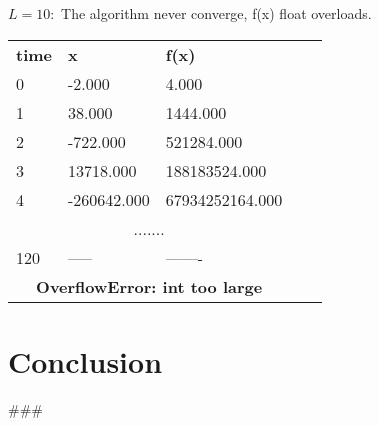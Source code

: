\documentclass{article}
\begin{document}
        \textbf{$L = 10:$} The algorithm never converge, f(x) float overloads.
    \begin{table}[]
        \begin{tabular}{|lll|ll}
        \cline{1-3}
        \multicolumn{1}{|l|}{\textbf{time}} & \multicolumn{1}{l|}{\textbf{x}}  & \textbf{f(x)}   &  &  \\ \cline{1-3}
        \multicolumn{1}{|l|}{0}             & \multicolumn{1}{l|}{-2.000}      & 4.000           &  &  \\ \cline{1-3}
        \multicolumn{1}{|l|}{1}             & \multicolumn{1}{l|}{38.000}      & 1444.000        &  &  \\ \cline{1-3}
        \multicolumn{1}{|l|}{2}             & \multicolumn{1}{l|}{-722.000}    & 521284.000      &  &  \\ \cline{1-3}
        \multicolumn{1}{|l|}{3}             & \multicolumn{1}{l|}{13718.000}   & 188183524.000   &  &  \\ \cline{1-3}
        \multicolumn{1}{|l|}{4}             & \multicolumn{1}{l|}{-260642.000} & 67934252164.000 &  &  \\ \cline{1-3}
        \multicolumn{3}{|c|}{.......}                                                            &  &  \\ \cline{1-3}
        \multicolumn{1}{|l|}{120}           & \multicolumn{1}{l|}{-----}       & -------         &  &  \\ \cline{1-3}
        \multicolumn{3}{|c|}{\textbf{OverflowError: int too large}}                              &  &  \\ \cline{1-3}
        \end{tabular}
        \end{table}


\section{Conclusion}
###
\end{document}
